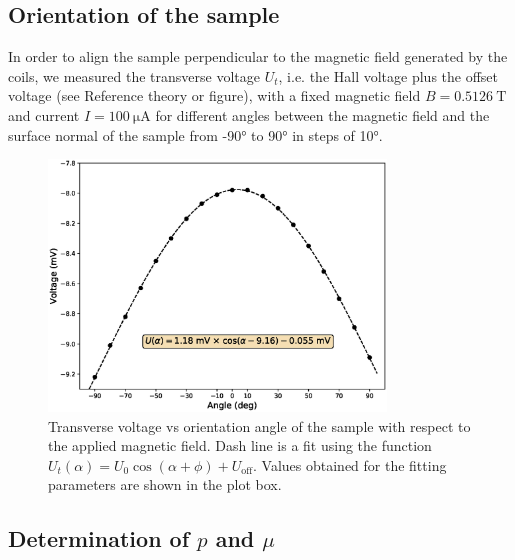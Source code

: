 \documentclass[11pt,a4paper]{article}
\begin{document}
\subsection{Orientation of the sample}

In order to align the sample perpendicular to the magnetic field generated by the coils, we measured the transverse voltage $U_t$, i.e. the Hall voltage plus the offset voltage (see {\color{red}Reference theory or figure}), with a fixed magnetic field $B=\SI{0.5126}{\tesla}$ and current $I=\SI{100}{\micro\ampere}$ for different angles between the magnetic field and the surface normal of the sample from \ang{-90} to \ang{90} in steps of \ang{10}.

\begin{figure}[ht]
\centering
\includegraphics[width=0.8\textwidth]{Voltage_vs_angle.eps}
\caption{Transverse voltage vs orientation angle of the sample with respect to the applied magnetic field. Dash line is a fit using the function $U_t(\alpha)=U_0\cos(\alpha+\phi) + U_\text{off}$. Values obtained for the fitting parameters are shown in the plot box.}
\label{fig:orientation}
\end{figure}

\subsection{Determination of $p$ and $\mu$}
\end{document}
